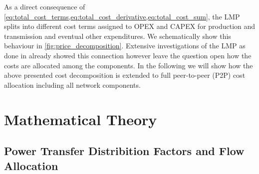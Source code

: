 \documentclass[11pt,twocolumn]{article}
\begin{document}
% 
As a direct consequence of \cref{eq:total_cost_terms,eq:total_cost_derivative,eq:total_cost_sum}, the LMP splits into different cost terms assigned to OPEX and CAPEX for production and transmission and eventual other expenditures. We schematically show this behaviour in \cref{fig:price_decomposition}. 
Extensive investigations of the LMP as done in \cite{schweppe_spot_1988} already showed this connection however leave the question open how the costs are allocated among the components. In the following we will show how the above presented cost decomposition is extended to full peer-to-peer (P2P) cost allocation including all network components. 



\section{Mathematical Theory}
\label{sec:theory}



\subsection{Power Transfer Distribition Factors and Flow Allocation}
\label{sec:ptdf_and_flow_allocation}
\end{document}
